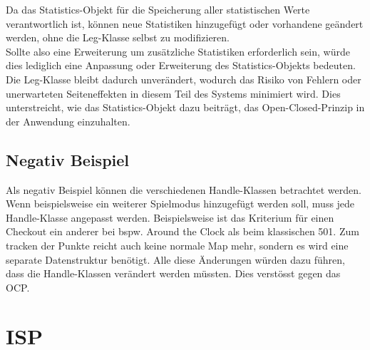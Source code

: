 Da das Statistics-Objekt für die Speicherung aller statistischen Werte verantwortlich ist, können neue Statistiken hinzugefügt oder vorhandene geändert werden, ohne die Leg-Klasse selbst zu modifizieren.\\

Sollte also eine Erweiterung um zusätzliche Statistiken erforderlich sein, würde dies lediglich eine Anpassung oder Erweiterung des Statistics-Objekts bedeuten. Die Leg-Klasse bleibt dadurch unverändert, wodurch das Risiko von Fehlern oder unerwarteten Seiteneffekten in diesem Teil des Systems minimiert wird. Dies unterstreicht, wie das Statistics-Objekt dazu beiträgt, das Open-Closed-Prinzip in der Anwendung einzuhalten.
\subsection{Negativ Beispiel}
Als negativ Beispiel können die verschiedenen Handle-Klassen betrachtet werden. Wenn beispielsweise ein weiterer Spielmodus hinzugefügt werden soll, muss jede Handle-Klasse angepasst werden. Beispielsweise ist das Kriterium für einen Checkout ein anderer bei bspw. Around the Clock als beim klassischen 501. Zum tracken der Punkte reicht auch keine normale Map mehr, sondern es wird eine separate Datenstruktur benötigt. Alle diese Änderungen würden dazu führen, dass die Handle-Klassen verändert werden müssten. Dies verstösst gegen das \acf{OCP}.
\section{\acf{ISP}}
